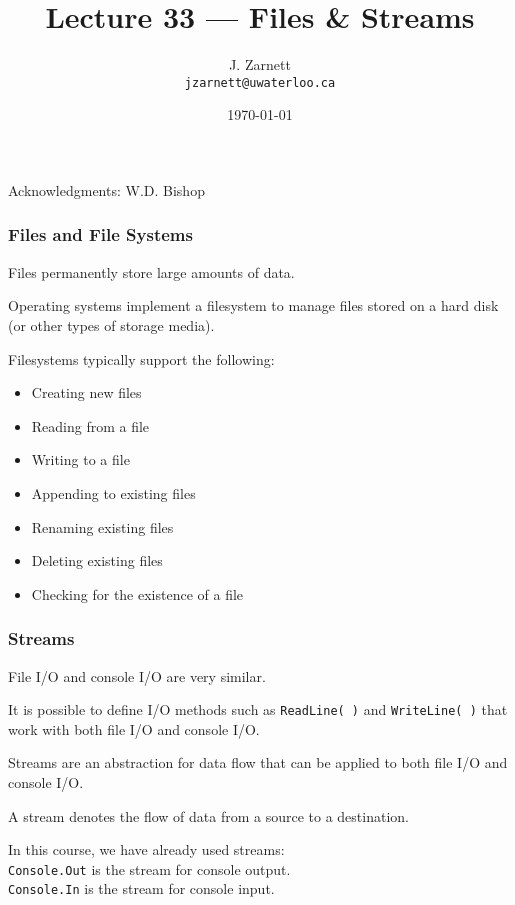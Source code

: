 

\title{Lecture 33 --- Files \& Streams }

\author{J. Zarnett\\
\texttt{jzarnett@uwaterloo.ca}}
\date{\today}



\begin{frame}
  \titlepage
  
  \begin{center}
  \small{Acknowledgments: W.D. Bishop}
  \end{center}
\end{frame}

\begin{frame}
\frametitle{Files and File Systems}

Files permanently store large amounts of data.

Operating systems implement a filesystem to manage files stored on a hard disk (or other types of storage media).

Filesystems typically support the following:
\begin{itemize}
\item Creating new files
\item Reading from a file
\item Writing to a file
\item Appending to existing files
\item Renaming existing files
\item Deleting existing files
\item Checking for the existence of a file
\end{itemize}

\end{frame}

\begin{frame}
\frametitle{Streams}

File I/O and console I/O are very similar.

It is possible to define I/O methods such as \texttt{ReadLine( )} and \texttt{WriteLine( )} that work with both file I/O and console I/O.

\alert{Stream}s are an abstraction for data flow that can be applied to both file I/O and console I/O.

A stream denotes the flow of data from a source to a destination.

In this course, we have already used streams:\\
\quad \texttt{Console.Out} is the stream for console output.\\
\quad \texttt{Console.In} is the stream for console input.


\end{frame}

